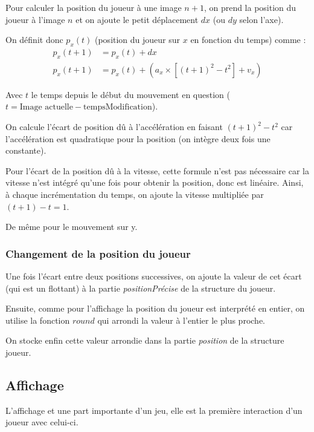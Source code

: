 \documentclass[12pt]{article}
\begin{document}
		Pour calculer la position du joueur à une image \(n + 1\), on prend la position du joueur à l'image \(n\) et on ajoute le petit déplacement \(dx\) (ou \(dy\) selon l'axe).
		
		On définit donc \(p_x(t)\) (position du joueur sur \(x\) en fonction du temps) comme :
		\begin{align*}
			p_x(t+1) &= p_x(t) + dx\\
			p_x(t+1)&= p_x(t) + (a_x \times [(t+1)^2 - t^2] + v_x)
		\end{align*}		
	
		Avec \(t\) le temps depuis le début du mouvement en question (\(t = \text{Image actuelle} - \text{tempsModification}\)).
		
		On calcule l'écart de position dû à l'accélération en faisant \((t+1)^2 - t^2\) car l'accélération est quadratique pour la position (on intègre deux fois une constante).
		
		Pour l'écart de la position dû à la vitesse, cette formule n'est pas nécessaire car la vitesse n'est intégré qu'une fois pour obtenir la position, donc est linéaire. Ainsi, à chaque incrémentation du temps, on ajoute la vitesse multipliée par \((t + 1) - t = 1\).
		
		De même pour le mouvement sur y.
		
		\subsubsection{Changement de la position du joueur}
		
		Une fois l'écart entre deux positions successives, on ajoute la valeur de cet écart (qui est un flottant) à la partie \textit{positionPrécise} de la structure du joueur. 
		
		Ensuite, comme pour l'affichage la position du joueur est interprété en entier, on utilise la fonction \(round\) qui arrondi la valeur à l'entier le plus proche.
		
		On stocke enfin cette valeur arrondie dans la partie \textit{position} de la structure joueur.
		
		\newpage
		
		\subsection{Affichage}
		
			L'affichage et une part importante d'un jeu, elle est la première interaction d'un joueur avec celui-ci.\\
\end{document}
